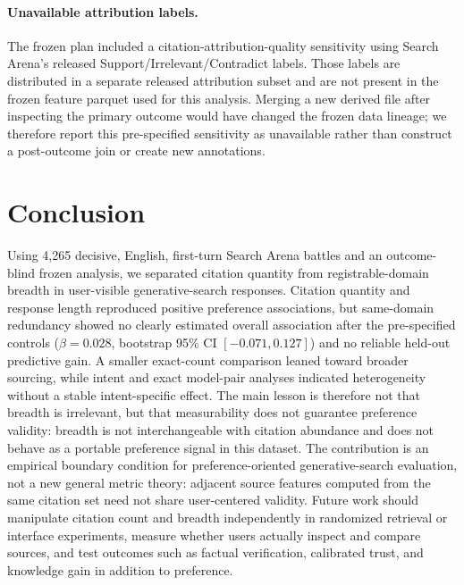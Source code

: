 \documentclass[sigconf,natbib=true,anonymous=true]{acmart}
\begin{document}
\paragraph{Unavailable attribution labels.}
The frozen plan included a citation-attribution-quality sensitivity using Search Arena's released Support/Irrelevant/Contradict labels. Those labels are distributed in a separate released attribution subset and are not present in the frozen feature parquet used for this analysis. Merging a new derived file after inspecting the primary outcome would have changed the frozen data lineage; we therefore report this pre-specified sensitivity as unavailable rather than construct a post-outcome join or create new annotations.

\section{Conclusion}
Using 4,265 decisive, English, first-turn Search Arena battles and an outcome-blind frozen analysis, we separated citation quantity from registrable-domain breadth in user-visible generative-search responses. Citation quantity and response length reproduced positive preference associations, but same-domain redundancy showed no clearly estimated overall association after the pre-specified controls ($\beta=0.028$, bootstrap 95\% CI $[-0.071,0.127]$) and no reliable held-out predictive gain. A smaller exact-count comparison leaned toward broader sourcing, while intent and exact model-pair analyses indicated heterogeneity without a stable intent-specific effect. The main lesson is therefore not that breadth is irrelevant, but that measurability does not guarantee preference validity: breadth is not interchangeable with citation abundance and does not behave as a portable preference signal in this dataset. The contribution is an empirical boundary condition for preference-oriented generative-search evaluation, not a new general metric theory: adjacent source features computed from the same citation set need not share user-centered validity. Future work should manipulate citation count and breadth independently in randomized retrieval or interface experiments, measure whether users actually inspect and compare sources, and test outcomes such as factual verification, calibrated trust, and knowledge gain in addition to preference.



\end{document}
